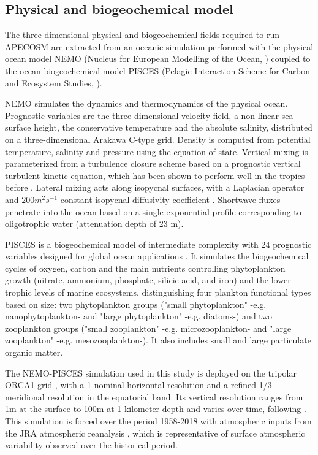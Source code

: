 \subsection{Physical and biogeochemical model}
\label{sec:nemo}

The three-dimensional physical and biogeochemical fields required to run APECOSM are extracted from an oceanic simulation performed with the physical ocean model NEMO (Nucleus for European Modelling of the Ocean, \citealp{madecNEMOOceanEngine2019}) coupled to the ocean biogeochemical model PISCES (Pelagic Interaction Scheme for Carbon and Ecosystem Studies, \citealp{aumontPISCESv2OceanBiogeochemical2015}). 

NEMO simulates the dynamics and thermodynamics of the physical ocean. Prognostic variables are
the three-dimensional velocity field, a non-linear sea surface height, the
conservative temperature and the absolute salinity, distributed on a three-dimensional Arakawa C-type grid. Density is computed from potential temperature, salinity and pressure using the \cite{iocInternationalThermodynamicEquation2010} equation of state. Vertical mixing is parameterized from a turbulence closure scheme based on a prognostic vertical turbulent kinetic equation, which has been shown to perform well in the tropics before \citep{blankeVariabilityTropicalAtlantic1993}. Lateral mixing acts along isopycnal surfaces, with a Laplacian operator and $200 m^2 s^{-1}$ constant isopycnal diffusivity coefficient \citep{lengaigneImpactIsopycnalMixing2003}. Shortwave fluxes penetrate into the ocean based on a single exponential profile \citep{paulsonIrradianceMeasurementsUpper1977} corresponding to oligotrophic water (attenuation depth of 23 m). 

PISCES is a biogeochemical model of intermediate complexity with 24 prognostic variables designed for global ocean applications \citep{aumontPISCESv2OceanBiogeochemical2015}. It simulates the biogeochemical cycles of oxygen, carbon and the main nutrients controlling phytoplankton growth (nitrate, ammonium, phosphate, silicic acid, and iron) and the lower trophic levels of marine ecosystems, distinguishing four plankton functional types based on size: two phytoplankton groups ("small phytoplankton" -e.g. nanophytoplankton- and "large phytoplankton" -e.g. diatoms-) and two zooplankton groups ("small zooplankton" -e.g. microzooplankton- and "large zooplankton" -e.g. mesozooplankton-). It also includes small and large particulate organic matter.

The NEMO-PISCES simulation used in this study is deployed on the tripolar ORCA1 grid \citep{madecGlobalOceanMesh1996}, with a 1\degree{} nominal horizontal resolution and a refined 1/3\degree{} meridional resolution in the equatorial band. Its vertical resolution ranges from 1m at the surface to 100m at 1 kilometer depth and varies over time, following \cite{levierFreeSurfaceVariable2007}. This simulation  is forced over the period 1958-2018 with atmospheric inputs from the JRA atmospheric reanalysis \citep{kobayashiJRA55ReanalysisGeneral2015}, which is representative of  surface atmospheric variability observed over the historical period. 

